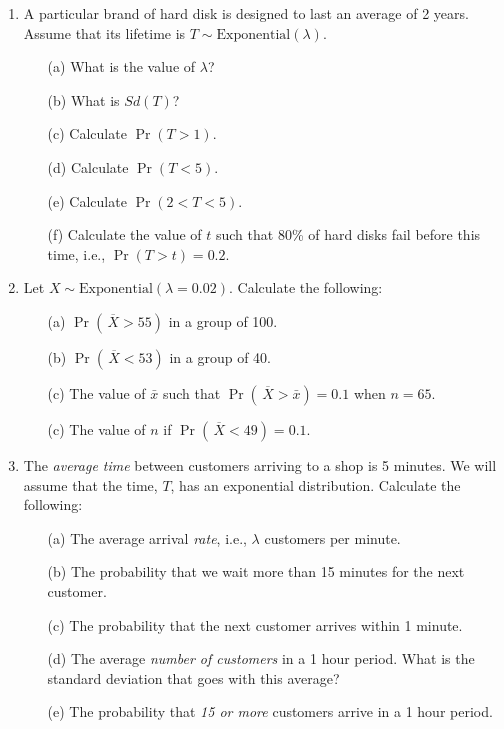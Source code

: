 \documentclass[]{report}
\begin{document}
\begin{enumerate}
\item 
A particular brand of hard disk is designed to last an average of 2 years. 
Assume that its lifetime is $T \sim \mbox{Exponential}(\lambda)$.\\
\begin{itemize}
\item[(a)] What is the value of $\lambda$?  \item[(b)] What is $Sd(T)$?  \item[(c)] Calculate $\Pr(T > 1)$.   \item[(d)] Calculate $\Pr(T < 5)$.  \item[(e)] Calculate $\Pr(2 < T < 5)$.  \item[(f)] Calculate the value of $t$ such that 80\% of hard disks fail before this time, i.e., $\Pr(T > t) = 0.2$.

\end{itemize}


\item 
Let $X \sim \text{Exponential}(\lambda=0.02)$. Calculate the following:\\
\begin{itemize}
\item[(a)] $\Pr(\,\overline{\!X} > 55)$ in a group of 100.  \item[(b)] $\Pr(\,\overline{\!X} < 53)$ in a group of 40.  \item[(c)] The value of $\bar x$ such that $\Pr(\,\overline{\!X} > \bar x) = 0.1$ when $n=65$.  \item[(c)] The value of $n$ if $\Pr(\,\overline{\!X} < 49) = 0.1$.
\end{itemize}

\item 
The \emph{average time} between customers arriving to a shop is 5 minutes. We will assume that the time, $T$, has an exponential distribution. Calculate the following:\\
\begin{itemize}
\item[(a)] The average arrival \emph{rate}, i.e., $\lambda$ customers per minute.  \item[(b)] The probability that we wait more than 15 minutes for the next customer.  \item[(c)] The probability that the next customer arrives within 1 minute.  \item[(d)] The average \emph{number of customers} in a 1 hour period. What is the standard deviation that goes with this average?  \item[(e)] The probability that \emph{15 or more} customers arrive in a 1 hour period.
\end{itemize}
\end{enumerate}
\end{document}
